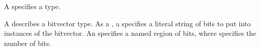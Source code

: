 A  specifies a type.

\begin{grammar}
\grRuleCont{\grEmpty}
\end{grammar}

A  describes a bitvector type. As a
, a  specifies a literal string
of bits to put into instances of the bitvector. An  specifies
a named region of bits, where  specifies the number of bits.
